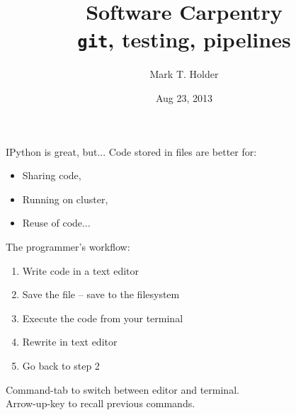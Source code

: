 \documentclass[xcolor=dvipsnames,compress,12pt]{beamer}
\title{\LARGE{Software Carpentry \\{\large \texttt{git}, testing, pipelines}}}
\date{\large Aug 23, 2013}
\author[Holder]{Mark T. Holder}
\institute[pt2012]{\inst{}Department of Ecology and Evolutionary Biology, University of Kansas}
\begin{document}
\maketitle



\begin{frame}{IPython is great, but...}
\Large
Code stored in files are better for:
\begin{itemize}
    \item Sharing code,
    \item Running on cluster,
    \item Reuse of code$\ldots$
\end{itemize}
\end{frame}

\begin{frame}{The programmer's workflow:}
\Large
\begin{enumerate}
    \item Write code in a text editor
    \item Save the file -- save to the filesystem
    \item Execute the code from your terminal
    \item Rewrite in text editor
    \item Go back to step 2
\end{enumerate}
{\large
Command-tab to switch between editor and terminal.\\
Arrow-up-key to recall previous commands.
}
\end{frame}
\end{document}

